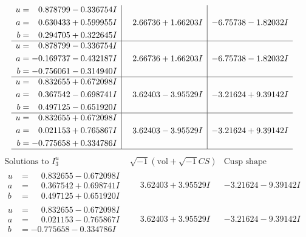 \documentclass[1p]{elsarticle_modified}
\theoremstyle{definition}
\newcommand{\I}{\sqrt{-1}}
\begin{document}
$$\begin{array}{c|c|c}
\begin{aligned}
u &= \phantom{-}0.878799 - 0.336754 I \\
a &= \phantom{-}0.630433 + 0.599955 I \\
b &= \phantom{-}0.294705 + 0.322645 I\end{aligned}
 & \phantom{-}2.66736 + 1.66203 I & -6.75738 - 1.82032 I \\ \hline\begin{aligned}
u &= \phantom{-}0.878799 - 0.336754 I \\
a &= -0.169737 - 0.432187 I \\
b &= -0.756061 - 0.314940 I\end{aligned}
 & \phantom{-}2.66736 + 1.66203 I & -6.75738 - 1.82032 I \\ \hline\begin{aligned}
u &= \phantom{-}0.832655 + 0.672098 I \\
a &= \phantom{-}0.367542 - 0.698741 I \\
b &= \phantom{-}0.497125 - 0.651920 I\end{aligned}
 & \phantom{-}3.62403 - 3.95529 I & -3.21624 + 9.39142 I \\ \hline\begin{aligned}
u &= \phantom{-}0.832655 + 0.672098 I \\
a &= \phantom{-}0.021153 + 0.765867 I \\
b &= -0.775658 + 0.334786 I\end{aligned}
 & \phantom{-}3.62403 - 3.95529 I & -3.21624 + 9.39142 I\\
 \hline 
 \end{array}$$\newpage$$\begin{array}{c|c|c}  
\text{Solutions to }I^u_{3}& \I (\text{vol} + \sqrt{-1}CS) & \text{Cusp shape}\\
 \hline 
\begin{aligned}
u &= \phantom{-}0.832655 - 0.672098 I \\
a &= \phantom{-}0.367542 + 0.698741 I \\
b &= \phantom{-}0.497125 + 0.651920 I\end{aligned}
 & \phantom{-}3.62403 + 3.95529 I & -3.21624 - 9.39142 I \\ \hline\begin{aligned}
u &= \phantom{-}0.832655 - 0.672098 I \\
a &= \phantom{-}0.021153 - 0.765867 I \\
b &= -0.775658 - 0.334786 I\end{aligned}
 & \phantom{-}3.62403 + 3.95529 I & -3.21624 - 9.39142 I \\ \hline\begin{aligned}

\end{aligned}
\end{array}$$
\end{document}
